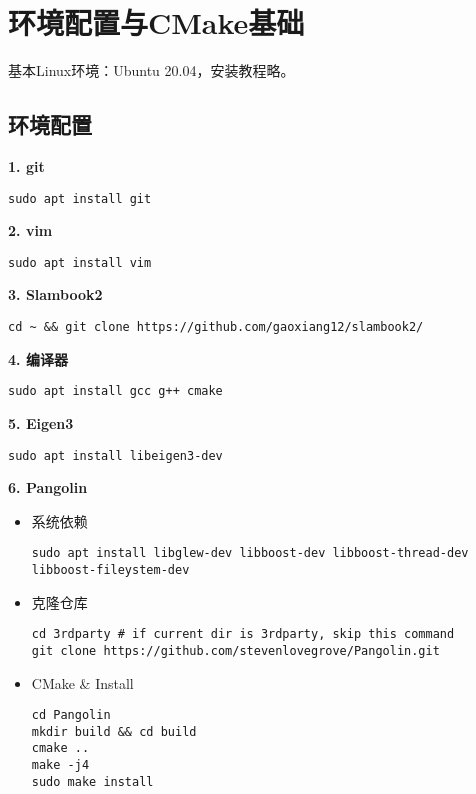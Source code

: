 \section{环境配置与CMake基础}
基本Linux环境：Ubuntu 20.04，安装教程略。
\subsection{环境配置}
\noindent \textbf{1. git}
\begin{lstlisting}[style=bash]
sudo apt install git
\end{lstlisting}

\noindent \textbf{2. vim}
\begin{lstlisting}[style=bash]
sudo apt install vim
\end{lstlisting}

\noindent \textbf{3. Slambook2}
\begin{lstlisting}[style=bash]
cd ~ && git clone https://github.com/gaoxiang12/slambook2/
\end{lstlisting}

\noindent \textbf{4. 编译器}
\begin{lstlisting}[style=bash]
sudo apt install gcc g++ cmake
\end{lstlisting}

\noindent \textbf{5. Eigen3}
\begin{lstlisting}[style=bash]
sudo apt install libeigen3-dev
\end{lstlisting}

\noindent \textbf{6. Pangolin}
\begin{itemize}[itemsep=0.1pt,topsep =2pt]
    \item 系统依赖
\begin{lstlisting}[style=bash]
sudo apt install libglew-dev libboost-dev libboost-thread-dev libboost-fileystem-dev
\end{lstlisting}
    \item 克隆仓库
\begin{lstlisting}[style=bash]
cd 3rdparty # if current dir is 3rdparty, skip this command
git clone https://github.com/stevenlovegrove/Pangolin.git
\end{lstlisting}   
    \item CMake \& Install
\begin{lstlisting}[style=bash]
cd Pangolin
mkdir build && cd build
cmake ..
make -j4
sudo make install
\end{lstlisting}   
\end{itemize}

